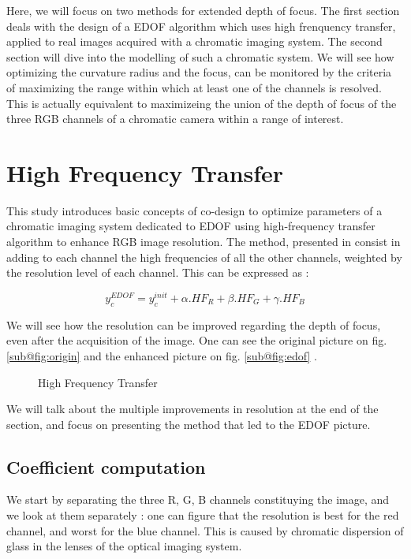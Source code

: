 \documentclass[10pt,letterpaper]{article}
\begin{document}
Here, we will focus on two methods for extended depth of focus. The first section deals with the design of a EDOF algorithm which uses high frenquency transfer, applied to real images acquired with a chromatic imaging system. The second section will dive into the modelling of such a chromatic system. We will see how optimizing the curvature radius and the focus, can be monitored by the criteria of maximizing the range within which at least one of the channels is resolved. This is actually equivalent to maximizeing the union of the depth of focus of the three RGB channels of a chromatic camera within a range of interest.

\section{High Frequency Transfer}
This study introduces basic concepts of co-design to optimize parameters of a chromatic imaging system dedicated to EDOF using high-frequency transfer algorithm to enhance RGB image resolution. The method, presented in \cite{TNT+08}consist in adding to each channel the high frequencies of all the other channels, weighted by the resolution level of each channel. This can be expressed as :

\begin{equation}\label{eqn:HFT}
    y_{c}^{EDOF} = y_{c}^{init} + \alpha . HF_R + \beta . HF_G + \gamma . HF_B
\end{equation}

\pagebreak

We will see how the resolution can be improved regarding the depth of focus, even after the acquisition of the image. One can see the original picture on fig. \ref{sub@fig:origin} and the enhanced picture on fig. \ref{sub@fig:edof} .

\begin{figure}[h]
    \centering
	\caption{High Frequency Transfer}
\end{figure}

We will talk about the multiple improvements in resolution at the end of the section, and focus on presenting the method that led to the EDOF picture.

\subsection*{Coefficient computation}
We start by separating the three R, G, B channels constituying the image, and we look at them separately : one can figure that the resolution is best for the red channel, and worst for the blue channel. This is caused by chromatic dispersion of glass in the lenses of the optical imaging system.
\end{document}
